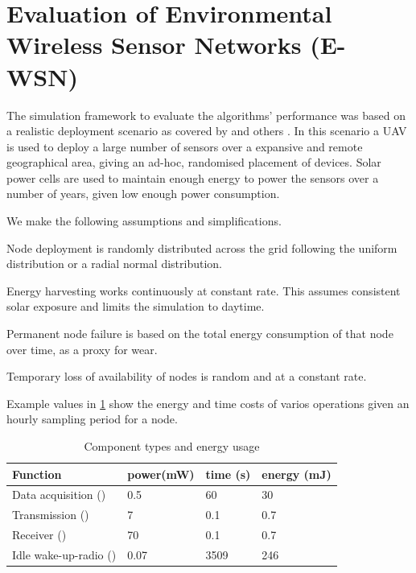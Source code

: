\section{Evaluation of Environmental Wireless Sensor Networks (E-WSN)}
\label{section:experimental}	

The simulation framework to evaluate the algorithms' performance was based on a realistic deployment scenario as covered by  \cite{Gomez2015} and others \cite{Jha2016, Avram}. In this scenario a UAV is used to deploy a large number of sensors over a expansive and remote geographical area, giving an ad-hoc, randomised placement of devices. Solar power cells are used to maintain enough energy to power the sensors over a number of years, given low enough power consumption. 

We make the following assumptions and simplifications.
\begin{itemize}{
		\item Node deployment is randomly distributed across the grid following the uniform distribution or a radial normal distribution.
		\item Energy harvesting works continuously at constant rate. This assumes consistent solar exposure and limits the simulation to daytime.
		\item Permanent node failure is based on the total energy consumption of that node over time, as a proxy for wear.
		\item Temporary loss of availability of nodes is random and at a constant rate.
	}
\end{itemize}

Example values in \ref{table:components_energy_usage} show the energy and time costs of varios operations given an hourly sampling period for a node.


\begin{table}[h]
	\begin{tabular}{p{}p{} p{} p{}}
		\hline
		\textbf{Function} & \textbf{power(mW)} & \textbf{time (s)} & \textbf{energy (mJ)}\\
		\hline
		Data acquisition (\symbolDataAcquisition{}{}) & 0.5 & 60 & 30 \\
		Transmission (\symbolTransmission{}{}) & 7 & 0.1 & 0.7 \\
		Receiver (\symbolReceiver{}{}) & 70 & 0.1 & 0.7 \\
		Idle wake-up-radio (\symbolWakeUpRadio{}{}) & 0.07 & 3509 & 246  \\
		\hline
	\end{tabular}
	\caption{Component types and energy usage}
	\label{table:components_energy_usage}
\end{table}

